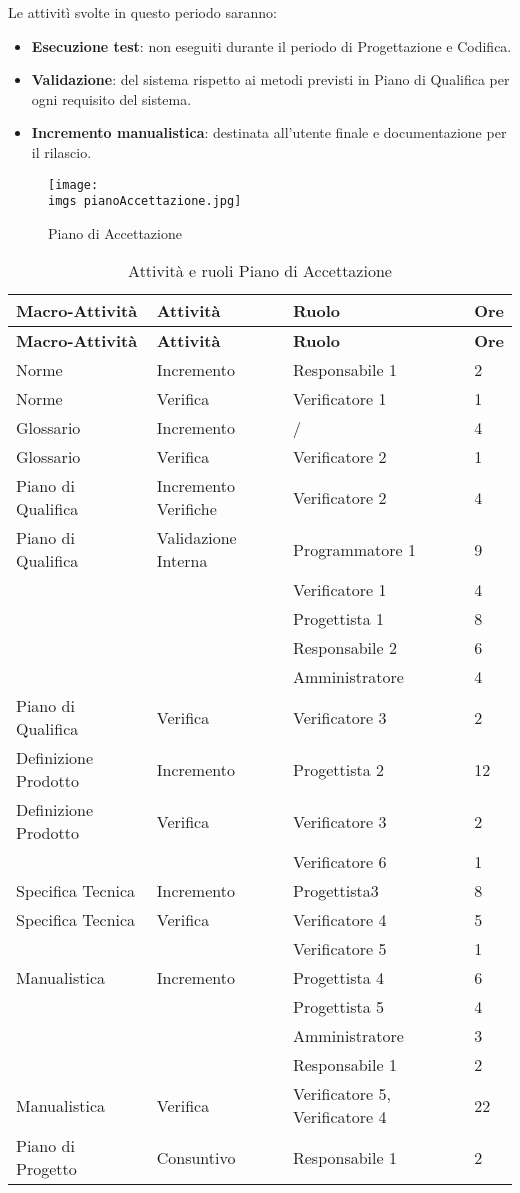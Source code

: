 {	Le attivit\`{i} svolte in questo periodo saranno:
	\begin{itemize}
		\item \textbf{Esecuzione test}: non eseguiti durante il periodo di Progettazione e Codifica.
		\item \textbf{Validazione}: del sistema rispetto ai metodi previsti in Piano di Qualifica per ogni requisito del sistema.
		\item \textbf{Incremento manualistica}: destinata all'utente finale e documentazione per il rilascio.
	\end{itemize}
	
	\begin{figure}[H]
		\texttt{[image: \\imgs pianoAccettazione.jpg]}
		\label{fig:pianoaccettazione}
		\caption{Piano di Accettazione}
	\end{figure}
	\begin{longtable} [c]{| l | l | l | l |}
	 \hline
	 \textbf{Macro-Attivit\`{a}} & \textbf{Attivit\`{a}} & \textbf{Ruolo} & \textbf{Ore}\\
	 \hline
	 \endfirsthead
	 \hline
	 \textbf{Macro-Attivit\`{a}} & \textbf{Attivit\`{a}} & \textbf{Ruolo} & \textbf{Ore}\\
	 \hline
		\endhead
	 \hline
	 \endfoot
	 \hline
	 \caption{Attivit\`{a} e ruoli Piano di Accettazione}
	 \endlastfoot
		Norme & Incremento & Responsabile 1 & 2 \\
		Norme & Verifica & Verificatore 1 & 1 \\
		Glossario & Incremento & / & 4 \\
		Glossario & Verifica & Verificatore 2 & 1 \\
		Piano di Qualifica & Incremento Verifiche & Verificatore 2 & 4 \\
		Piano di Qualifica & Validazione Interna & Programmatore 1 & 9 \\
		&	&	Verificatore 1	&	4\\
		&	&	Progettista 1	&	8\\
		&	&	Responsabile 2	&	6\\
		&	&	Amministratore	&	4\\
		Piano di Qualifica & Verifica & Verificatore 3 & 2 \\
		Definizione Prodotto & Incremento & Progettista 2 & 12 \\
		Definizione Prodotto & Verifica & Verificatore 3 & 2\\
		&	&	Verificatore 6 & 1\\
		Specifica Tecnica & Incremento & Progettista3 & 8 \\
		Specifica Tecnica & Verifica & Verificatore 4 & 5\\
		&	&	Verificatore 5 & 1\\
		Manualistica & Incremento & Progettista 4 & 6\\
		&	&	Progettista 5 & 4\\
		&	&	Amministratore & 3\\
		&	&	Responsabile 1 & 2\\
		Manualistica & Verifica & Verificatore 5, Verificatore 4 & 22 \\
		Piano di Progetto & Consuntivo & Responsabile 1 & 2 \\
	\end{longtable}
}